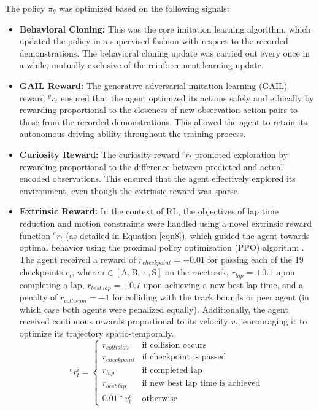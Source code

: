 \documentclass[letterpaper, 10 pt, conference]{ieeeconf}  %
\begin{document}
	The policy $\pi_{\theta}$ was optimized based on the following signals:
	
	\begin{itemize}
		\item \textbf{Behavioral Cloning:} This was the core imitation learning algorithm, which updated the policy in a supervised fashion with respect to the recorded demonstrations. The behavioral cloning \cite{bain1995} update was carried out every once in a while, mutually exclusive of the reinforcement learning update.
		\item \textbf{GAIL Reward:} The generative adversarial imitation learning (GAIL) reward \cite{ho2016} $^{g}r_t$ ensured that the agent optimized its actions safely and ethically by rewarding proportional to the closeness of new observation-action pairs to those from the recorded demonstrations. This allowed the agent to retain its autonomous driving ability throughout the training process.
		\item \textbf{Curiosity Reward:} The curiosity reward \cite{pathak2017} $^{c}r_t$ promoted exploration by rewarding proportional to the difference between predicted and actual encoded observations. This ensured that the agent effectively explored its environment, even though the extrinsic reward was sparse.
		\item \textbf{Extrinsic Reward:} In the context of RL, the objectives of lap time reduction and motion constraints were handled using a novel extrinsic reward function $^{e}r_t$ (as detailed in Equation \ref{eqn8}), which guided the agent towards optimal behavior using the proximal policy optimization (PPO) algorithm \cite{PPO2017}. The agent received a reward of $r_{checkpoint}=+0.01$ for passing each of the 19 checkpoints $c_i$, where $i \in \left [ \text{A}, \text{B}, \cdots, \text{S} \right ]$ on the racetrack, $r_{lap}=+0.1$ upon completing a lap, $r_{best\:lap}=+0.7$ upon achieving a new best lap time, and a penalty of $r_{collision}=-1$ for colliding with the track bounds or peer agent (in which case both agents were penalized equally). Additionally, the agent received continuous rewards proportional to its velocity $v_t$, encouraging it to optimize its trajectory spatio-temporally.
		\begin{equation}
		^{e}r_t^i  =  
		\begin{cases}
		r_{collision} & \text{if collision occurs} \\
		r_{checkpoint} & \text{if checkpoint is passed} \\
		r_{lap} & \text{if completed lap} \\
		r_{best\:lap} & \text{if new best lap time is achieved} \\
		0.01*v_t^i & \text{otherwise}
		\end{cases}
		\label{eqn8}
		\end{equation}
	\end{itemize}
	
\end{document}
